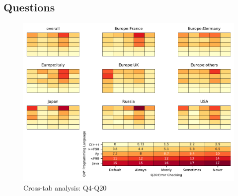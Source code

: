 
\subsection{Questions}


\begin{figure}
\begin{center}
\includegraphics[width=12cm]{../pdfs/Q4-Q20.pdf}
\caption{Cross-tab analysis: Q4-Q20}
\label{fig:Q4-Q20}
\end{center}
\end{figure}
